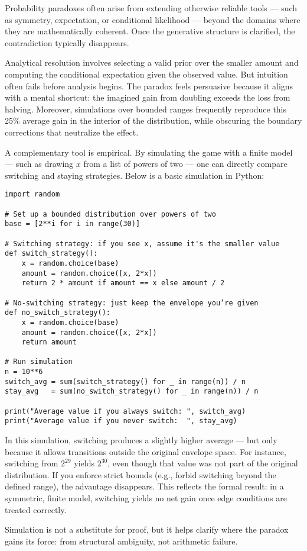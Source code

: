 \begin{commentary}
Probability paradoxes often arise from extending otherwise reliable tools — such as symmetry, expectation, or conditional likelihood — beyond the domains where they are mathematically coherent. Once the generative structure is clarified, the contradiction typically disappears.

Analytical resolution involves selecting a valid prior over the smaller amount and computing the conditional expectation given the observed value. But intuition often fails before analysis begins. The paradox feels persuasive because it aligns with a mental shortcut: the imagined gain from doubling exceeds the loss from halving. Moreover, simulations over bounded ranges frequently reproduce this 25\% average gain in the interior of the distribution, while obscuring the boundary corrections that neutralize the effect.

A complementary tool is empirical. By simulating the game with a finite model — such as drawing $x$ from a list of powers of two — one can directly compare switching and staying strategies. Below is a basic simulation in Python:

\begin{verbatim}
import random

# Set up a bounded distribution over powers of two
base = [2**i for i in range(30)]

# Switching strategy: if you see x, assume it's the smaller value
def switch_strategy():
    x = random.choice(base)
    amount = random.choice([x, 2*x])
    return 2 * amount if amount == x else amount / 2

# No-switching strategy: just keep the envelope you’re given
def no_switch_strategy():
    x = random.choice(base)
    amount = random.choice([x, 2*x])
    return amount

# Run simulation
n = 10**6
switch_avg = sum(switch_strategy() for _ in range(n)) / n
stay_avg   = sum(no_switch_strategy() for _ in range(n)) / n

print("Average value if you always switch: ", switch_avg)
print("Average value if you never switch:  ", stay_avg)
\end{verbatim}

In this simulation, switching produces a slightly higher average — but only because it allows transitions outside the original envelope space. For instance, switching from \( 2^{29} \) yields \( 2^{30} \), even though that value was not part of the original distribution. If you enforce strict bounds (e.g., forbid switching beyond the defined range), the advantage disappears. This reflects the formal result: in a symmetric, finite model, switching yields no net gain once edge conditions are treated correctly.

Simulation is not a substitute for proof, but it helps clarify where the paradox gains its force: from structural ambiguity, not arithmetic failure.

\end{commentary}

